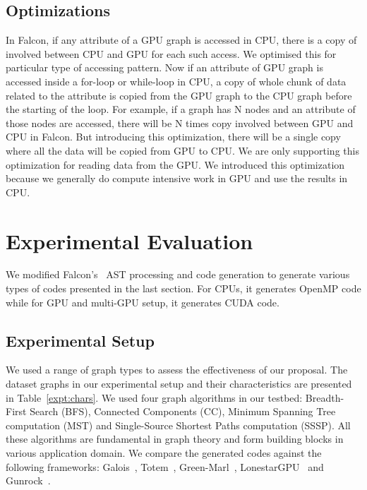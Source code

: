 \documentclass[12pt]{article}
\begin{document}
\subsection{Optimizations}\label{sec:optimizations}
    In Falcon, if any attribute of a GPU graph is accessed in CPU, there is a copy of involved between CPU and GPU for each such access. We optimised this for particular type of accessing pattern. Now if an attribute of GPU graph is accessed inside a for-loop or while-loop in CPU, a copy of whole chunk of data related to the attribute is copied from the GPU graph to the CPU graph before the starting of the loop. For example, if a graph has N nodes and an attribute of those nodes are accessed, there will be N times copy involved between GPU and CPU in Falcon. But introducing this optimization, there will be a single copy where all the data will be copied from GPU to CPU. We are only supporting this optimization for reading data from the GPU. We introduced this optimization because we generally do compute intensive work in GPU and use the results in CPU.

\section{Experimental Evaluation}\label{sec:results}
We modified Falcon's~\cite{falcon} AST processing and code generation to generate various types of codes presented in the last section.
For CPUs, it generates OpenMP code while for GPU and multi-GPU setup, it generates CUDA code.

\subsection{Experimental Setup}\label{expt:setup}
We used a range of graph types to assess the effectiveness of our proposal.
The dataset graphs in our experimental setup and their characteristics are presented in Table~\ref{expt:chars}.
We used four graph algorithms in our testbed: Breadth-First Search (BFS), Connected Components (CC), Minimum Spanning Tree computation (MST) and Single-Source Shortest Paths computation (SSSP).
All these algorithms are fundamental in graph theory and form building blocks in various application domain.
We compare the generated codes against the following frameworks: Galois~\cite{Pingali:2011:TPA:1993316.1993501}, Totem~\cite{Gharaibeh:2012:YOT:2370816.2370866}, Green-Marl~\cite{Hong:2012:GDE:2150976.2151013}, LonestarGPU~\cite{nasre13:MAG:2517327.2442531} and Gunrock~\cite{Wang:2016:GHG:3016078.2851145}.
\end{document}
